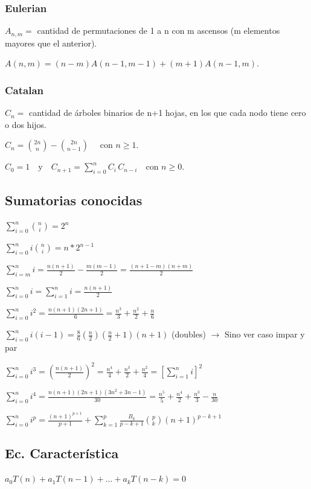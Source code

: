 {{{
} 
\subsubsection{Eulerian}
{
\( {\displaystyle A_{n, m}=} \) cantidad de permutaciones de 1 a n con m ascensos (m elementos mayores que el anterior).

\( {\displaystyle A(n,m)=(n-m)A(n-1,m-1)+(m+1)A(n-1,m).} \)
}
\subsubsection{Catalan}
{
\( {\displaystyle C_{n}=} \) cantidad de árboles binarios de n+1 hojas, en los que cada nodo tiene cero o dos hijos.

\({\displaystyle C_{n}={2n \choose n}-{2n \choose n-1}\quad {\mbox{ con }}n\geq 1.} \)

\( {\displaystyle C_{0}=1\quad {\mbox{y}}\quad C_{n+1}=\sum _{i=0}^{n}C_{i}\,C_{n-i}\quad {\mbox{con }}n\geq 0.} \)
}

}

\subsection{Sumatorias conocidas}
{
$\sum_{i=0}^n\binom{n}{i}=2^n$

$\sum_{i=0}^n i\binom{n}{i}=n*2^{n-1}$

$\sum_{i=m}^n i = \frac{n(n+1)}{2} - \frac{m(m-1)}{2} = \frac{(n+1-m)(n+m)}{2}$

$\sum_{i=0}^n i = \sum_{i=1}^n i = \frac{n(n+1)}{2}$

$\sum_{i=0}^n i^2 = \frac{n(n+1)(2n+1)}{6} = \frac{n^3}{3} + \frac{n^2}{2} + \frac{n}{6}$

$\sum_{i=0}^n i(i-1) = \frac{8}{6}(\frac{n}{2})(\frac{n}{2}+1)(n+1)$ (doubles) $\rightarrow$ Sino ver caso impar y par

$\sum_{i=0}^n i^3 = \left(\frac{n(n+1)}{2}\right)^2 = \frac{n^4}{4} + \frac{n^3}{2} + \frac{n^2}{4} = \left[\sum_{i=1}^n i\right]^2$

$\sum_{i=0}^n i^4 = \frac{n(n+1)(2n+1)(3n^2+3n-1)}{30} = \frac{n^5}{5} + \frac{n^4}{2} + \frac{n^3}{3} - \frac{n}{30}$

$\sum_{i=0}^n i^p = \frac{(n+1)^{p+1}}{p+1} + \sum_{k=1}^p\frac{B_k}{p-k+1}{p\choose k}(n+1)^{p-k+1}$

}

\subsection{Ec. Característica}
$a_0T(n)+a_1T(n-1)+...+a_kT(n-k)=0$

}
